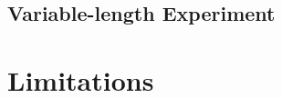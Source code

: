 \documentclass{article} %
\begin{document}
\subsection{Variable-length Experiment}

\section{Limitations}
\label{sec:limitations}


\small

\end{document}
